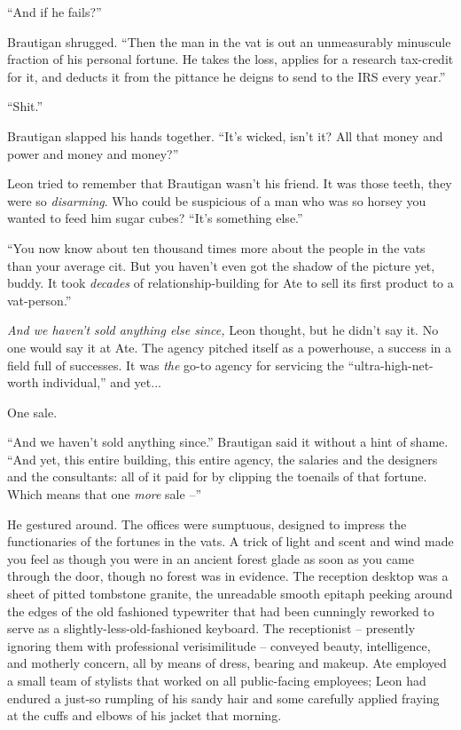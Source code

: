 “And if he fails?”

Brautigan shrugged. “Then the man in the vat is out an unmeasurably 
minuscule fraction of his personal fortune. He takes the loss, applies 
for a research tax-credit for it, and deducts it from the pittance he 
deigns to send to the IRS every year.”

“Shit.”

Brautigan slapped his hands together. “It's wicked, isn't it? All 
that money and power and money and money?”

Leon tried to remember that Brautigan wasn't his friend. It was those 
teeth, they were so \emph{disarming}. Who could be suspicious of a man 
who was so horsey you wanted to feed him sugar cubes? “It's something 
else.”

“You now know about ten thousand times more about the people in the 
vats than your average cit. But you haven't even got the shadow of the 
picture yet, buddy. It took \emph{decades} of relationship-building for 
Ate to sell its first product to a vat-person.”

\emph{And we haven't sold anything else since,} Leon thought, but he 
didn't say it. No one would say it at Ate. The agency pitched itself as 
a powerhouse, a success in a field full of successes. It was \emph{the} 
go-to agency for servicing the “ultra-high-net-worth individual,” 
and yet...

One sale.

“And we haven't sold anything since.” Brautigan said it without a 
hint of shame. “And yet, this entire building, this entire agency, 
the salaries and the designers and the consultants: all of it paid for 
by clipping the toenails of that fortune. Which means that one 
\emph{more} sale --”

He gestured around. The offices were sumptuous, designed to impress the 
functionaries of the fortunes in the vats. A trick of light and scent 
and wind made you feel as though you were in an ancient forest glade as 
soon as you came through the door, though no forest was in evidence. 
The reception desktop was a sheet of pitted tombstone granite, the 
unreadable smooth epitaph peeking around the edges of the old fashioned 
typewriter that had been cunningly reworked to serve as a 
slightly-less-old-fashioned keyboard. The receptionist -- presently 
ignoring them with professional verisimilitude -- conveyed beauty, 
intelligence, and motherly concern, all by means of dress, bearing and 
makeup. Ate employed a small team of stylists that worked on all 
public-facing employees; Leon had endured a just-so rumpling of his 
sandy hair and some carefully applied fraying at the cuffs and elbows 
of his jacket that morning.

